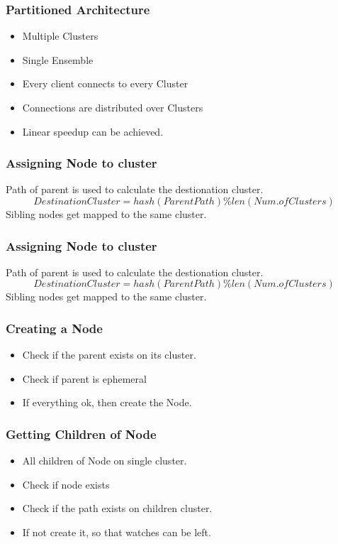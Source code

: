 \documentclass[10pt, compress]{beamer}
\begin{document}
\begin{frame}[fragile]
    \frametitle{Partitioned Architecture}
    \begin{itemize}
        \item Multiple Clusters
        \item Single Ensemble
        \item Every client connects to every Cluster
        \item Connections are distributed over Clusters
        \item Linear speedup can be achieved.
    \end{itemize}
\end{frame}

\begin{frame}[fragile]
    \frametitle{Assigning Node to cluster}
    Path of parent is used to calculate the destionation cluster.
    \begin{equation}
        Destination Cluster = hash(Parent Path) \% len(Num. of Clusters)
    \end{equation}
    Sibling nodes get mapped to the same cluster.
\end{frame}

\begin{frame}[fragile]
    \frametitle{Assigning Node to cluster}
    Path of parent is used to calculate the destionation cluster.
    \begin{equation}
        Destination Cluster = hash(Parent Path) \% len(Num. of Clusters)
    \end{equation}
    Sibling nodes get mapped to the same cluster.
\end{frame}

\begin{frame}[fragile]
    \frametitle{Creating a Node}
    \begin{itemize}
        \item Check if the parent exists on its cluster.
        \item Check if parent is ephemeral
        \item If everything ok, then create the Node.
    \end{itemize}
\end{frame}

\begin{frame}[fragile]
    \frametitle{Getting Children of Node}
    \begin{itemize}
        \item All children of Node on single cluster.
        \item Check if node exists
        \item Check if the path exists on children cluster.
        \item If not create it, so that watches can be left.
    \end{itemize}
\end{frame}
\end{document}
